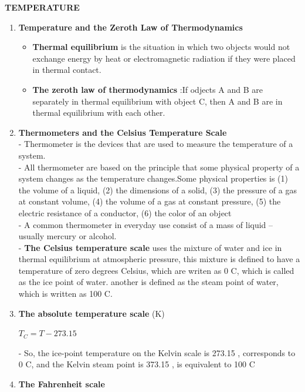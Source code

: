 \documentclass[10pt]{article}
\begin{document}
\begin{center}
\textbf{TEMPERATURE}
\end{center}
\begin{enumerate}
	\item \textbf{Temperature and the Zeroth Law of Thermodynamics}
	\begin{itemize}
		\item \textbf{Thermal equilibrium} is the situation in which two objects would not exchange energy by heat or electromagnetic radiation if they were placed in thermal contact.
		\item \textbf{The zeroth law of thermodynamics} :If odjects A and B are separately in thermal equilibrium with object C, then A and B are in thermal equilibrium with each other.
	\end{itemize}
	\item \textbf{Thermometers and the Celsius Temperature Scale}\\
	- Thermometer is the devices that are used to measure the temperature of a system.\\
	- All thermometer are based on the principle that some physical property of a system changes as the temperature changes.Some physical properties is (1) the volume of a liquid, (2) the dimensions of a solid, (3) the pressure of a gas at constant volume, (4) the volume of a gas at constant pressure, (5) the electric resistance of a conductor, (6) the color of an object\\
	- A common thermometer in  everyday use consist of a mass of liquid -- usually mercury or alcohol.\\
	- \textbf{The Celsius temperature scale} uses the mixture of water and ice in thermal equilibrium at atmospheric pressure, this mixture is defined to have a temperature of zero degrees Celsius, which are writen as 0 \degree C, which is called as the ice point of water. another is defined as the steam point of water, which is written as 100 \degree C.
	\item \textbf{The absolute temperature scale} (\degree K)
	\begin{mybox}
	\begin{center}
	$T_C = T - 273.15$
	\end{center}
	\end{mybox}
	- So, the ice-point temperature on the Kelvin scale is 273.15 \degree, corresponds to 0 \degree C, and the Kelvin steam point is 373.15 \degree, is equivalent to 100 \degree C
	\item \textbf{The Fahrenheit scale}

\end{enumerate}
\end{document}
